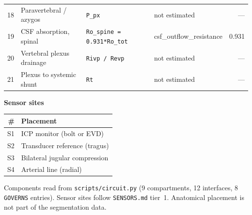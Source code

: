 \documentclass[11pt]{article}
\begin{document}
\begin{tabular}{@{}r l l l r@{}}
18 & Paravertebral / azygos & \texttt{\small P\_px} & {\small \color{ungov}not estimated} & --- \\
19 & CSF absorption, spinal & \texttt{\small Ro\_spine = 0.931*Ro\_tot} & {\small csf\_outflow\_resistance} & 0.931 \\
20 & Vertebral plexus drainage & \texttt{\small Rivp / Revp} & {\small \color{ungov}not estimated} & --- \\
21 & Plexus to systemic shunt & \texttt{\small Rt} & {\small \color{ungov}not estimated} & --- \\
\bottomrule
\end{tabular}

\vspace{4mm}
{\sffamily\bfseries\large Sensor sites\par}
\vspace{2mm}
\begin{tabular}{@{}r l@{}}
\toprule
\# & Placement \\
\midrule
S1 & ICP monitor (bolt or EVD) \\
S2 & Transducer reference (tragus) \\
S3 & Bilateral jugular compression \\
S4 & Arterial line (radial) \\
\bottomrule
\end{tabular}

\vspace{5mm}
{\footnotesize\color{ink2}Components read from \texttt{scripts/circuit.py} (9 compartments,
12 interfaces, 8 \texttt{GOVERNS} entries). Sensor sites follow \texttt{SENSORS.md} tier~1.
Anatomical placement is not part of the segmentation data.\par}
\end{document}
